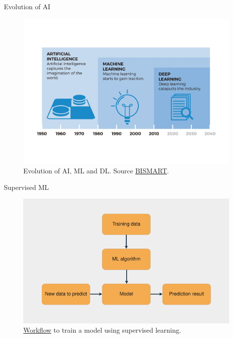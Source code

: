 \documentclass{beamer}
\begin{document}
\begin{frame}{Evolution of AI}
    \begin{figure}
        \includegraphics[width=0.8\linewidth]{MLDLevol}
        \caption{Evolution of AI, ML and DL. Source \href{https://blog.bismart.com/diferencia-machine-learning-deep-learning}{BISMART}.}
        \label{Fig:MLDLevol}
    \end{figure}
\end{frame}

\begin{frame}{Supervised ML}
    \begin{figure}
        \includegraphics[width=0.9\linewidth]{ML}
        \caption{\href{https://realpython.com/python-ai-neural-network/}{Workflow} to train a model using supervised learning.}
        \label{Fig:ML}
    \end{figure}
\end{frame}
\end{document}
